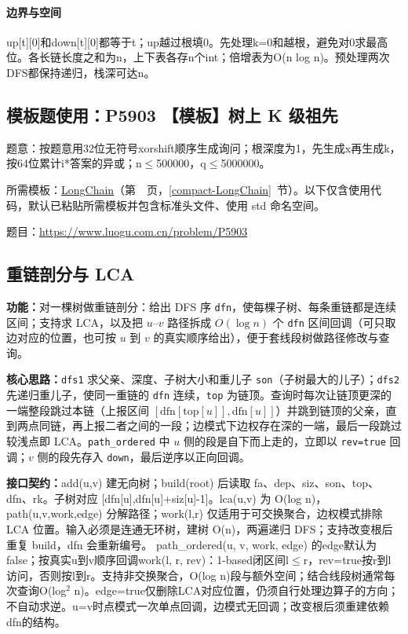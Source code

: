 \paragraph{边界与空间} up[t][0]和down[t][0]都等于t；up越过根填0。先处理k=0和越根，避免对0求最高位。各长链长度之和为n，上下表各存n个int；倍增表为O(n log n)。预处理两次DFS都保持递归，栈深可达n。

\Needspace{549pt}

\subsection*{模板题使用：P5903 【模板】树上 K 级祖先}

\label{usage-example-376}

题意：按题意用32位无符号xorshift顺序生成询问；根深度为1，先生成x再生成k，按64位累计i*答案的异或；n$\le$500000，q$\le$5000000。

所需模板：\hyperref[compact-LongChain]{LongChain}（第~\pageref{compact-LongChain}~页，\ref{compact-LongChain}~节）。以下仅含使用代码，默认已粘贴所需模板并包含标准头文件、使用 std 命名空间。

题目：\url{https://www.luogu.com.cn/problem/P5903}



\subsection{重链剖分与 LCA}\label{compact-HLD}

\noindent\textbf{功能：}\allowbreak 对一棵树做重链剖分：给出 DFS 序 \texttt{dfn}，使每棵子树、每条重链都是连续区间；支持求 LCA，以及把 $u$--$v$ 路径拆成 $O(\log n)$ 个 \texttt{dfn} 区间回调（可只取边对应的位置，也可按 $u$ 到 $v$ 的真实顺序给出），便于套线段树做路径修改与查询。

\textbf{核心思路：}\allowbreak \texttt{dfs1} 求父亲、深度、子树大小和重儿子 \texttt{son}（子树最大的儿子）；\texttt{dfs2} 先递归重儿子，使同一重链的 \texttt{dfn} 连续，\texttt{top} 为链顶。查询时每次让链顶更深的一端整段跳过本链（上报区间 $[\mathrm{dfn}[\mathrm{top}[u]],\mathrm{dfn}[u]]$）并跳到链顶的父亲，直到两点同链，再上报二者之间的一段；边模式下边权存在深的一端，最后一段跳过较浅点即 LCA。\texttt{path\_ordered} 中 $u$ 侧的段是自下而上走的，立即以 \texttt{rev=true} 回调；$v$ 侧的段先存入 \texttt{down}，最后逆序以正向回调。



{\sloppy{}\noindent\textbf{接口契约：}add(u,v) 建无向树；build(root) 后读取 fa、dep、siz、son、top、dfn、rk。子树对应 [dfn[u],dfn[u]+siz[u]-1]。lca(u,v) 为 O(log n)，path(u,v,work,edge) 分解路径；work(l,r) 仅适用于可交换聚合，边权模式排除 LCA 位置。输入必须是连通无环树，建树 O(n)，两遍递归 DFS；支持改变根后重复 build，dfn 会重新编号。 path\_ordered(u, v, work, edge) 的edge默认为false；按真实u到v顺序回调work(l, r, rev)：1-based闭区间l$\le$r，rev=true按r到l访问，否则按l到r。支持非交换聚合，O(log n)段与额外空间；结合线段树通常每次查询O(log$^{2}$ n)。edge=true仅删除LCA对应位置，仍须自行处理边算子的方向；不自动求逆。u=v时点模式一次单点回调，边模式无回调；改变根后须重建依赖dfn的结构。\par}

